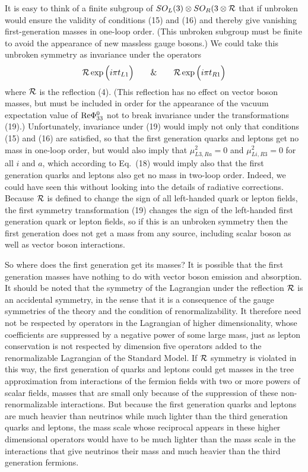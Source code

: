 \documentclass[12pt]{article}
\begin{document}
It is easy to think of a  finite subgroup of $SO_L(3)\otimes SO_R(3 \otimes {\cal R}$ that if unbroken would ensure the validity of conditions (15) and (16) and thereby give vanishing first-generation masses in one-loop order.
(This unbroken subgroup  must be finite to avoid the appearance of new massless gauge bosons.)  We could take this unbroken symmetry as invariance under the operators
\begin{equation}
{\cal R}\exp\Big(i\pi t_{L1}\Big)~~~~~~\&~~~~~~ {\cal R}\exp\Big(i\pi t_{R1}\Big)
\end{equation}
where ${\cal R}$ is the reflection (4).  (This reflection has no effect on vector boson masses, but must be included in order for the appearance of the vacuum expectation value of ${\rm Re}\Phi_{33}^0$ not to break invariance under the transformations (19).)
Unfortunately, invariance under (19) would imply not only that conditions (15) and (16) are satisfied, so that the first generation quarks and leptons get no mass in one-loop order, but would also imply that 
$ \mu^2_{L3,Ra}=0$ and $\mu^2_{Li,R3}=0$ for all $i$ and $a$, which according to Eq.~(18) would imply also that the first generation quarks and leptons also get no mass in two-loop order.  Indeed, we could have seen this without looking into the details of radiative corrections.  Because ${\cal R}$ is defined to change the sign of all left-handed quark or lepton fields, the first  symmetry transformation (19) changes the sign of the left-handed first generation quark or lepton fields, so if this is an unbroken symmetry then the first generation does not get a mass from any source, including scalar boson as well as vector boson interactions.  

So where does the first generation get its masses?    
It is  possible that the first generation masses have nothing to do with vector boson emission and absorption.  It should be noted that the symmetry of the Lagrangian under the reflection  ${\cal R}$ is an accidental symmetry, in the sense that it is a consequence of the gauge symmetries of the theory and the condition of renormalizability.  It therefore need not be respected by operators in the Lagrangian of higher dimensionality, whose coefficients are suppressed by a negative power of some large mass, just as lepton conservation is not respected by dimension five operators added to the renormalizable Lagrangian of the Standard Model.  If ${\cal R}$ symmetry is violated in this way,  the first generation of quarks and leptons could get masses in the tree approximation from interactions of the fermion fields with two or more powers of 
scalar fields, masses that are small only because of the suppression of these non-renormalizable interactions.  But because the first generation quarks and leptons are much heavier than neutrinos while much lighter than the third generation quarks and leptons, the mass scale whose reciprocal appears in these higher dimensional operators would have to be much lighter than the mass scale in the interactions that give neutrinos their mass and much heavier than the third generation fermions.  
\end{document}
